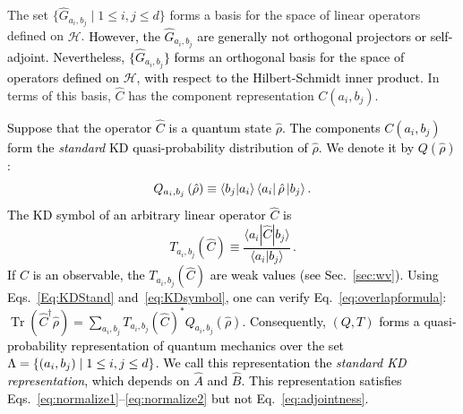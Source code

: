 \documentclass[%
 reprint,
superscriptaddress,
nofootinbib,
bibnotes,
 amsmath,amssymb,
 aps,
]{revtex4-1}
\theoremstyle{plain}
\DeclareMathOperator{\Tr}{Tr}
\newcommand{\Dave}[1]{\textcolor{black}{#1} }
\newcommand{\nicole}[1]{\textcolor{black}{#1} }
\begin{document}
The set $\{\hat{G}_{a_i,b_j}\mid 1\leq i,j\leq d\}$ forms a  basis 
for the space of linear operators defined on $\mathcal H$. \Dave{However,  the $\hat{G}_{a_i, b_j}$ are generally not \Dave{orthogonal} projectors or self-adjoint. 
Nevertheless, $\{\hat{G}_{a_i,b_j} \}$ forms an orthogonal basis for the space of operators defined on $\mathcal{H}$, with respect to the Hilbert-Schmidt inner product.}
In terms of this basis, $\hat{C}$ has the  component representation $C(a_i,b_j)$. 



\nicole{Suppose that the operator $\hat{C}$ is a quantum state $\hat{\rho}$. The components $C(a_i,b_j) $ form the \textit{standard} KD quasi-probability distribution of $\hat \rho$. We denote it by $Q(\hat{\rho})$:   
\begin{equation}
\label{Eq:KDStand}
   Q_{a_i,b_j} \left( \hat{\rho} \right) 
   \equiv  \braket{b_j | a_i } \bra{a_i} \hat{\rho} \ket{b_j} .
\end{equation}
\Dave{The KD symbol of an arbitrary linear operator $\hat{C}$ is}
\begin{equation}\label{eq:KDsymbol}
T_{a_i,b_j}(\hat C)
\equiv \frac{\langle a_i|\hat C|b_j\rangle}{\langle a_i|b_j\rangle} \, .
\end{equation}
If $\hat C$ is an observable, the $T_{a_i,b_j}(\hat C)$ are weak values (see Sec.~\ref{sec:wv}). Using Eqs.~\eqref{Eq:KDStand} and~\eqref{eq:KDsymbol}, one can verify Eq.~\eqref{eq:overlapformula}:
\nicole{ $\Tr(\hat C^\dagger\hat \rho)=\sum_{a_i,b_j} T_{a_i,b_j}(\hat C)^* Q_{a_i,b_j}(\hat \rho).$  }
Consequently, $(Q,T)$ forms a quasi-probability representation of quantum mechanics over the set $\Dave{ \Lambda=\{(a_i,b_j)\mid 1\leq i,j\leq d\}}$. We call this representation \Dave{the} \emph{standard KD representation}, which \Dave{depends}
on $\hat{A}$ and $\hat{B}$. This representation satisfies Eqs.~\eqref{eq:normalize1}--\eqref{eq:normalize2} but not Eq.~\eqref{eq:adjointness}.
}
\end{document}
